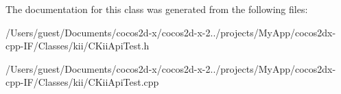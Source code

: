 The documentation for this class was generated from the following files\-:\begin{DoxyCompactItemize}
\item 
/\-Users/guest/\-Documents/cocos2d-\/x/cocos2d-\/x-\/2../projects/\-My\-App/cocos2dx-\/cpp-\/\-I\-F/\-Classes/kii/C\-Kii\-Api\-Test.\-h\item 
/\-Users/guest/\-Documents/cocos2d-\/x/cocos2d-\/x-\/2../projects/\-My\-App/cocos2dx-\/cpp-\/\-I\-F/\-Classes/kii/C\-Kii\-Api\-Test.\-cpp\end{DoxyCompactItemize}
